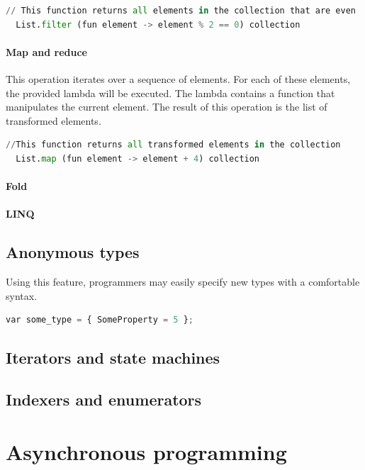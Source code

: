 \documentclass{article}
\begin{document}
\begin{lstlisting}[language=Python]
  // This function returns all elements in the collection that are even
  List.filter (fun element -> element % 2 == 0) collection
\end{lstlisting}

\paragraph{Map and reduce}
This operation iterates over a sequence of elements. For each of these elements, the provided lambda will be executed.
The lambda contains a function that manipulates the current element. The result of this operation is the list of transformed elements.

\begin{lstlisting}[language=Python]
  //This function returns all transformed elements in the collection
  List.map (fun element -> element + 4) collection
\end{lstlisting}
  
\paragraph{Fold}

\paragraph{LINQ}


\subsection{Anonymous types}
Using this feature, programmers may easily specify new types with a comfortable syntax.

\begin{lstlisting}[language=Python]
  var some_type = { SomeProperty = 5 };
\end{lstlisting}

\subsection{Iterators and state machines}


\subsection{Indexers and enumerators}

\newpage

\section{Asynchronous programming}
\end{document}
